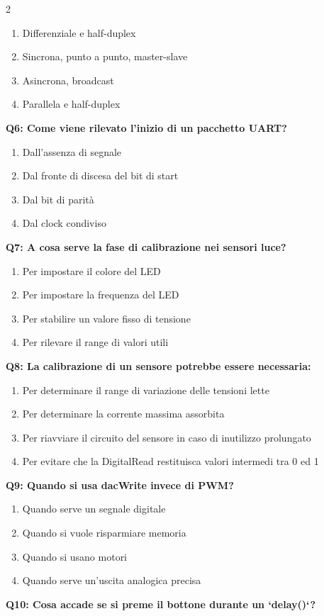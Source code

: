 \documentclass[10pt]{article}
\begin{document}
\begin{multicols}{2}
\begin{enumerate}[label=\arabic*.]
\item Differenziale e half-duplex
\item Sincrona, punto a punto, master-slave
\item Asincrona, broadcast
\item Parallela e half-duplex
\end{enumerate}
\textbf{Q6: Come viene rilevato l’inizio di un pacchetto UART?}

\begin{enumerate}[label=\arabic*.]
\item Dall’assenza di segnale
\item Dal fronte di discesa del bit di start
\item Dal bit di parità
\item Dal clock condiviso
\end{enumerate}
\textbf{Q7: A cosa serve la fase di calibrazione nei sensori luce?}

\begin{enumerate}[label=\arabic*.]
\item Per impostare il colore del LED
\item Per impostare la frequenza del LED
\item Per stabilire un valore fisso di tensione
\item Per rilevare il range di valori utili
\end{enumerate}
\textbf{Q8: La calibrazione di un sensore potrebbe essere necessaria:}

\begin{enumerate}[label=\arabic*.]
\item Per determinare il range di variazione delle tensioni lette
\item Per determinare la corrente massima assorbita
\item Per riavviare il circuito del sensore in caso di inutilizzo prolungato
\item Per evitare che la DigitalRead restituisca valori intermedi tra 0 ed 1
\end{enumerate}
\textbf{Q9: Quando si usa dacWrite invece di PWM?}

\begin{enumerate}[label=\arabic*.]
\item Quando serve un segnale digitale
\item Quando si vuole risparmiare memoria
\item Quando si usano motori
\item Quando serve un’uscita analogica precisa
\end{enumerate}
\textbf{Q10: Cosa accade se si preme il bottone durante un `delay()`?}


\end{multicols}
\end{document}
